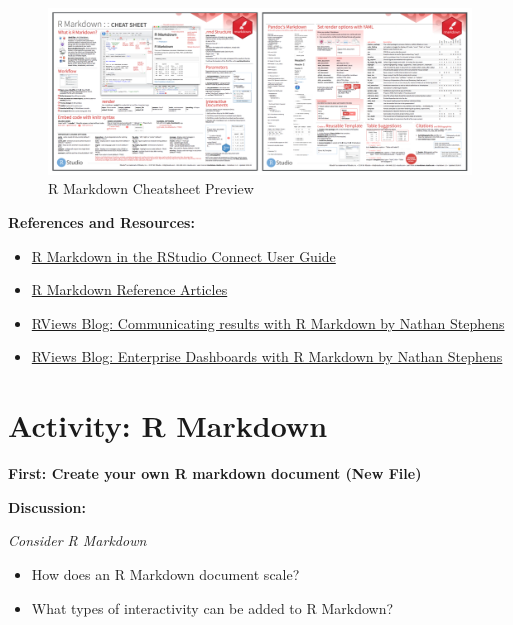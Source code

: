 \documentclass[]{book}
\providecommand{\tightlist}{%
  \setlength{\itemsep}{0pt}\setlength{\parskip}{0pt}}
\theoremstyle{definition}
\theoremstyle{definition}
\theoremstyle{definition}
\theoremstyle{remark}
\begin{document}
\begin{figure}
\centering
\includegraphics{imgs/shiny-alt/rmd-cheatsheet.png}
\caption{R Markdown Cheatsheet Preview}
\end{figure}

\textbf{References and Resources:}

\begin{itemize}
\tightlist
\item
  \href{https://docs.rstudio.com/connect/user/r-markdown.html}{R
  Markdown in the RStudio Connect User Guide}
\item
  \href{https://rmarkdown.rstudio.com/articles.html}{R Markdown
  Reference Articles}
\item
  \href{https://rviews.rstudio.com/2018/11/01/r-markdown-a-better-approach/}{RViews
  Blog: Communicating results with R Markdown by Nathan Stephens}
\item
  \href{https://rviews.rstudio.com/2018/05/16/replacing-excel-reports-with-r-markdown-and-shiny/}{RViews
  Blog: Enterprise Dashboards with R Markdown by Nathan Stephens}
\end{itemize}

\hypertarget{activity-r-markdown}{%
\section{Activity: R Markdown}\label{activity-r-markdown}}

\textbf{First: Create your own R markdown document (New File)}

\textbf{Discussion:}

\emph{Consider R Markdown}

\begin{itemize}
\tightlist
\item
  How does an R Markdown document scale?
\item
  What types of interactivity can be added to R Markdown?
\end{itemize}
\end{document}
